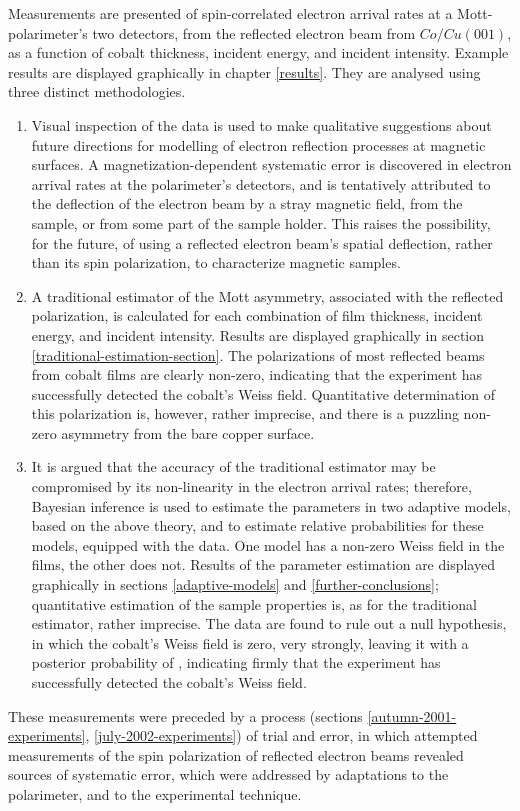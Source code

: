 Measurements are presented of spin-correlated electron arrival rates
at a Mott-polarimeter's two detectors, from the reflected electron beam
from $Co/Cu(001)$, as a function of cobalt thickness, incident energy,
and incident intensity.  Example results are displayed graphically in
chapter \ref{results}.  They are analysed using three distinct
methodologies.
\begin{enumerate}
\item{}Visual inspection of the data is used to make qualitative
  suggestions about future directions for modelling of electron
  reflection processes at magnetic surfaces.  A
  magnetization-dependent systematic error is discovered in electron
  arrival rates at the polarimeter's detectors, and is tentatively
  attributed to the deflection of the electron beam by a stray
  magnetic field, from the sample, or from some part of the sample
  holder.  This raises the possibility, for the future, of using a
  reflected electron beam's spatial deflection, rather than its spin
  polarization, to characterize magnetic samples.
\item{}A traditional estimator of the Mott asymmetry, associated with
  the reflected polarization, is calculated for each combination of
  film thickness, incident energy, and incident intensity.  Results
  are displayed graphically in section
  \ref{traditional-estimation-section}.  The polarizations of most
  reflected beams from cobalt films are clearly non-zero, indicating
  that the experiment has successfully detected the cobalt's Weiss
  field.  Quantitative determination of this polarization is, however,
  rather imprecise, and there is a puzzling non-zero asymmetry from
  the bare copper surface.
\item{}It is argued that the accuracy of the traditional estimator may
  be compromised by its non-linearity in the electron arrival rates;
  therefore, Bayesian inference is used to estimate the parameters in
  two adaptive models, based on the above theory, and to estimate
  relative probabilities for these models, equipped with the data.
  One model has a non-zero Weiss field in the films, the other does
  not.  Results of the parameter estimation are displayed graphically
  in sections \ref{adaptive-models} and \ref{further-conclusions};
  quantitative estimation of the sample properties is, as for the
  traditional estimator, rather imprecise.  The data are found to rule
  out a null hypothesis, in which the cobalt's Weiss field is zero,
  very strongly, leaving it with a posterior probability of
  , indicating firmly that the experiment has
  successfully detected the cobalt's Weiss field.
\end{enumerate}

These measurements were preceded by a process (sections
\ref{autumn-2001-experiments}, \ref{july-2002-experiments}) of trial
and error, in which attempted measurements of the spin polarization of
reflected electron beams revealed sources of systematic error, which
were addressed by adaptations to the polarimeter, and to the
experimental technique.
